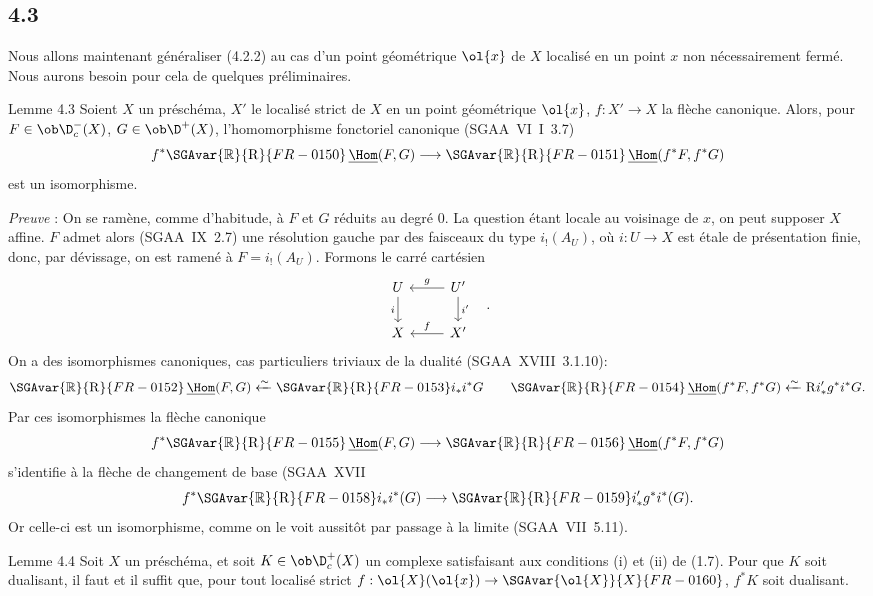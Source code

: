 \subsection*{4.3}
Nous allons maintenant généraliser (4.2.2) au cas d'un point géométrique $\ol{x}$ de $X$ localisé en un point $x$ non nécessairement fermé. Nous aurons besoin pour cela de quelques préliminaires.

\begin{statement}{Lemme 4.3}
Soient $X$ un préschéma, $X'$ le localisé strict de $X$ en un point géométrique $\ol{x}$, $f:X'\to X$ la flèche canonique. Alors, pour $F\in\ob\D_c^-(X)$, $G\in\ob\D^+(X)$, l'homomorphisme fonctoriel canonique (SGAA~VI~I~3.7)
\[
f^*\SGAvar{\mathbb{R}}{\mathrm{R}}{FR-0150}\,\underline{\Hom}(F,G)\longrightarrow \SGAvar{\mathbb{R}}{\mathrm{R}}{FR-0151}\,\underline{\Hom}(f^*F,f^*G)
\]
est un isomorphisme.
\end{statement}

\emph{Preuve} : On se ramène, comme d'habitude, à $F$ et $G$ réduits au degré $0$. La question étant locale au voisinage de $x$, on peut supposer $X$ affine. $F$ admet alors (SGAA~IX~2.7) une résolution gauche par des faisceaux du type $i_!(A_U)$, où $i:U\to X$ est étale de présentation finie, donc, par dévissage, on est ramené à $F=i_!(A_U)$. Formons le carré cartésien
\[
\begin{tikzcd}
U \arrow[d,"i"'] & U' \arrow[l,"g"'] \arrow[d,"i'"] \\
X & X' \arrow[l,"f"']
\end{tikzcd}\quad .
\]
On a des isomorphismes canoniques, cas particuliers triviaux de la dualité (SGAA~XVIII~3.1.10):
\[
\SGAvar{\mathbb{R}}{\mathrm{R}}{FR-0152}\,\underline{\Hom}(F,G)\xleftarrow{\sim}\SGAvar{\mathbb{R}}{\mathrm{R}}{FR-0153} i_* i^*G
\qquad
\SGAvar{\mathbb{R}}{\mathrm{R}}{FR-0154}\,\underline{\Hom}(f^*F,f^*G)\xleftarrow{\sim}\mathrm{R} i'_* g^*i^*G.
\]
Par ces isomorphismes la flèche canonique
\[
f^*\SGAvar{\mathbb{R}}{\mathrm{R}}{FR-0155}\,\underline{\Hom}(F,G)\longrightarrow \SGAvar{\mathbb{R}}{\mathrm{R}}{FR-0156}\,\underline{\Hom}(f^*F,f^*G)
\]
s'identifie à la flèche de changement de base (SGAA~XVII
\[
f^*\SGAvar{\mathbb{R}}{\mathrm{R}}{FR-0158} i_*i^*(G)\longrightarrow \SGAvar{\mathbb{R}}{\mathrm{R}}{FR-0159} i'_*g^*i^*(G).
\]
Or
celle-ci est un isomorphisme, comme on le voit aussitôt par passage à la limite (SGAA~VII~5.11).

\begin{statement}{Lemme 4.4}
Soit $X$ un préschéma, et soit $K\in\ob\D_c^+(X)$ un complexe satisfaisant aux conditions (i) et (ii) de (1.7). Pour que $K$ soit dualisant, il faut et il suffit que, pour tout localisé strict $f:\ol{X}(\ol{x})\to \SGAvar{\ol{X}}{X}{FR-0160}$, $f^*K$ soit dualisant.
\end{statement}

